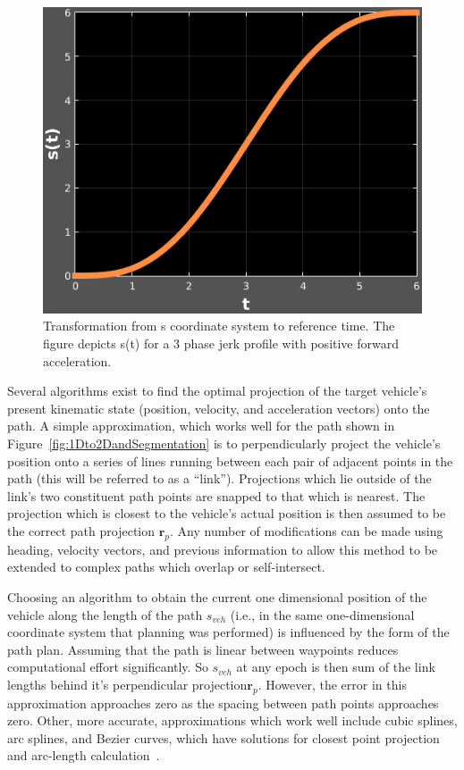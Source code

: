 \documentclass[letterpaper, 10 pt, conference]{ieeeconf}  %
\begin{document}
\begin{figure}[thpb]
  \centering
  \includegraphics[width=0.5\columnwidth]{graphics/s(t)_generic.png}
  \caption{
    Transformation from s coordinate system to reference time.
    The figure depicts s(t) for a 3 phase jerk profile with positive forward acceleration.
  }
  \label{fig:stot}
\end{figure}


Several algorithms exist to find the optimal projection of the target vehicle's present kinematic state (position, velocity, and acceleration vectors) onto the path.
A simple approximation, which works well for the path shown in Figure~\ref{fig:1Dto2DandSegmentation} is to perpendicularly project the vehicle's position onto a series of lines running between each pair of adjacent points in the path (this will be referred to as a ``link'').
Projections which lie outside of the link's two constituent path points are snapped to that which is nearest.
The projection which is closest to the vehicle's actual position is then assumed to be the correct path projection $\mathbf{r}_p$.
Any number of modifications can be made using heading, velocity vectors, and previous information to allow this method to be extended to complex paths which overlap or self-intersect.

Choosing an algorithm to obtain the current one dimensional position of the vehicle along the length of the path $s_{veh}$ (i.e., in the same one-dimensional coordinate system that planning was performed) is influenced by the form of the path plan.
Assuming that the path is linear between waypoints reduces computational effort significantly.
So $s_{veh}$ at any epoch is then sum of the link lengths behind it's perpendicular projection$\mathbf{r}_p$.
However, the error in this approximation approaches zero as the spacing between path points approaches zero.
Other, more accurate, approximations which work well include cubic splines, arc splines, and Bezier curves, which have solutions for closest point projection and arc-length calculation~\cite{Wang2002,Wang2003,Schindler2011}.
\end{document}
